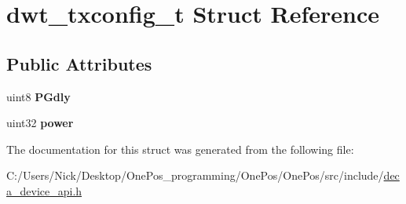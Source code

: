 \hypertarget{structdwt__txconfig__t}{\section{dwt\-\_\-txconfig\-\_\-t Struct Reference}
\label{structdwt__txconfig__t}
}
\subsection*{Public Attributes}
\begin{DoxyCompactItemize}
\item 
\hypertarget{structdwt__txconfig__t_ab6958ba8bdcf728178382d7608d174a0}{uint8 {\bfseries P\-Gdly}}\label{structdwt__txconfig__t_ab6958ba8bdcf728178382d7608d174a0}

\item 
\hypertarget{structdwt__txconfig__t_a587fac4132b28fa0f7cc11cae9e70d66}{uint32 {\bfseries power}}\label{structdwt__txconfig__t_a587fac4132b28fa0f7cc11cae9e70d66}

\end{DoxyCompactItemize}


The documentation for this struct was generated from the following file\-:\begin{DoxyCompactItemize}
\item 
C\-:/\-Users/\-Nick/\-Desktop/\-One\-Pos\-\_\-programming/\-One\-Pos/\-One\-Pos/src/include/\hyperlink{deca__device__api_8h}{deca\-\_\-device\-\_\-api.\-h}\end{DoxyCompactItemize}
